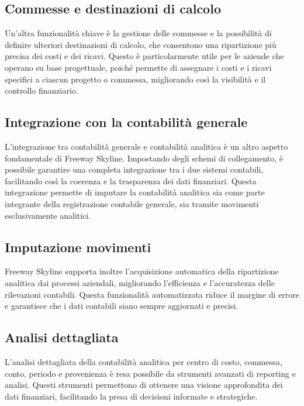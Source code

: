 \documentclass{article}
\begin{document}
\subsection{Commesse e destinazioni di calcolo}

Un'altra funzionalità chiave è la gestione delle commesse e la possibilità di definire ulteriori destinazioni di calcolo, che consentono una ripartizione più precisa dei costi e dei ricavi. Questo è particolarmente utile per le aziende che operano su base progettuale, poiché permette di assegnare i costi e i ricavi specifici a ciascun progetto o commessa, migliorando così la visibilità e il controllo finanziario.

\subsection{Integrazione con la contabilità generale}

L'integrazione tra contabilità generale e contabilità analitica è un altro aspetto fondamentale di Freeway Skyline. Impostando degli schemi di collegamento, è possibile garantire una completa integrazione tra i due sistemi contabili, facilitando così la coerenza e la trasparenza dei dati finanziari. Questa integrazione permette di imputare la contabilità analitica sia come parte integrante della registrazione contabile generale, sia tramite movimenti esclusivamente analitici.

\subsection{Imputazione movimenti}

Freeway Skyline supporta inoltre l'acquisizione automatica della ripartizione analitica dai processi aziendali, migliorando l'efficienza e l'accuratezza delle rilevazioni contabili. Questa funzionalità automatizzata riduce il margine di errore e garantisce che i dati contabili siano sempre aggiornati e precisi.

\subsection{Analisi dettagliata}

L'analisi dettagliata della contabilità analitica per centro di costo, commessa, conto, periodo e provenienza è resa possibile da strumenti avanzati di reporting e analisi. Questi strumenti permettono di ottenere una visione approfondita dei dati finanziari, facilitando la presa di decisioni informate e strategiche. 
\end{document}
